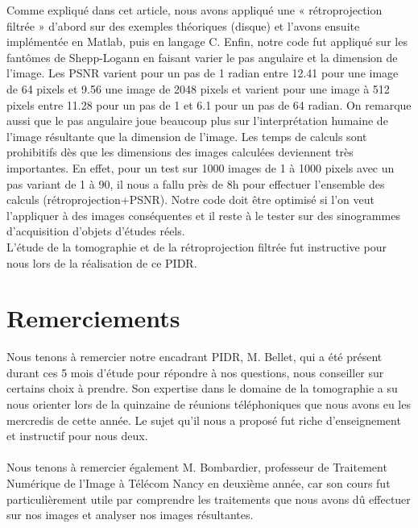 \documentclass[conference]{IEEEtran}
\begin{document}
Comme expliqué dans cet article, nous avons appliqué une « rétroprojection filtrée » d’abord sur des exemples théoriques (disque) et l’avons ensuite implémentée en Matlab, puis en langage C. Enfin, notre code fut appliqué sur les fantômes de Shepp-Logann en faisant varier le pas angulaire et la dimension de l'image. Les PSNR varient pour un pas de 1 radian entre 12.41 pour une image de 64 pixels et 9.56 une image de 2048 pixels et varient pour une image à 512 pixels entre 11.28 pour un pas de 1 et 6.1 pour un pas de 64 radian. On remarque aussi que le pas angulaire joue beaucoup plus sur l'interprétation humaine de l'image résultante que la dimension de l'image. Les temps de calculs sont prohibitifs dès que les dimensions des images calculées deviennent très importantes. En effet, pour un test sur 1000 images de 1 à 1000 pixels avec un pas variant de 1 à 90, il nous a fallu près de 8h pour effectuer l'ensemble des calculs (rétroprojection+PSNR). Notre code doit être optimisé si l'on veut l'appliquer à des images conséquentes et il reste à le tester sur des sinogrammes d'acquisition d'objets d'études réels. 
\\
L'étude de la tomographie et de la rétroprojection filtrée fut instructive pour nous lors de la réalisation de ce PIDR.




\section*{Remerciements}

Nous tenons à remercier notre encadrant PIDR, M. Bellet, qui a été présent durant ces 5 mois d'étude pour répondre à nos questions, nous conseiller sur certains choix à prendre. Son expertise dans le domaine de la tomographie a su nous orienter lors de la quinzaine de réunions téléphoniques que nous avons eu les mercredis de cette année. Le sujet qu'il nous a proposé fut riche d'enseignement et instructif pour nous deux.
\\
\\
Nous tenons à remercier également M. Bombardier, professeur de Traitement Numérique de l'Image à Télécom Nancy en deuxième année, car son cours fut particulièrement utile par comprendre les traitements que nous avons dû effectuer sur nos images et analyser nos images résultantes.


\end{document}
